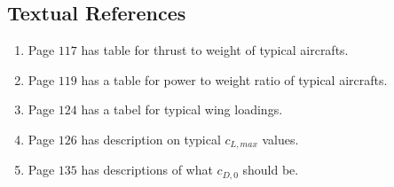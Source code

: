\documentclass[letter, 12pt]{article}
\begin{document}
\begin{center}
\section{Textual References}
\begin{comment}
\end{comment}
\begin{enumerate}
\item Page $117$ has table for thrust to weight of typical aircrafts.
\item Page $119$ has a table for power to weight ratio of typical aircrafts.
\item Page $124$ has a tabel for typical wing loadings.
\item Page $126$ has description on typical $c_{L,max}$ values.
\item Page $135$ has descriptions of what $c_{D,0}$ should be.
\end{enumerate}

\begin{comment}
Take-off distance is shown in this equation for a propeller (Page $130$)
$$\frac{W}{S} = T_{op} \sigma c_{L,TO}(hp/W)$$
wherein $T_{op}$ represents
$\sigma$ represents the density ratio. This is basically just the air density $\rho$ at takeoff altitude divided by sea-level density
$c_{L,TO}$ represents the take-off lift coefficient. This is the maximum lift coefficient divided by $1.21 = 1.1^{2}$. This is because the aircraft takes off at around $1.1$ of its stall speed.
$hp$ represents 
$W$ represents take-off weight of the aircraft
\end{comment}


\end{center}
\end{document}
